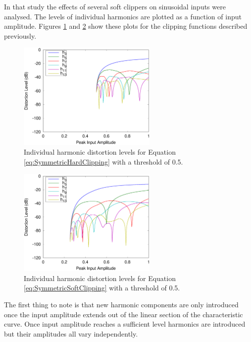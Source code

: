 			In that study the effects of several soft clippers on sinusoidal inputs were analysed. The levels
			of individual harmonics are plotted as a function of input amplitude. Figures
			\ref{fig:HardClippingHarmonics} and \ref{fig:SoftClippingHarmonics} show these plots for the
			clipping functions described previously.

			\begin{figure}[h!]
				\centering
				\includegraphics[width=0.6\textwidth]{chapter5/Images/HardClippingHarmonics.eps}
				\caption{Individual harmonic distortion levels for Equation \ref{eq:SymmetricHardClipping}
					 with a threshold of 0.5.}
				\label{fig:HardClippingHarmonics}
			\end{figure}

			\begin{figure}[h!]
				\centering
				\includegraphics[width=0.6\textwidth]{chapter5/Images/SoftClippingHarmonics.eps}
				\caption{Individual harmonic distortion levels for Equation \ref{eq:SymmetricSoftClipping}
					 with a threshold of 0.5.}
				\label{fig:SoftClippingHarmonics}
			\end{figure}

			The first thing to note is that new harmonic components are only introduced once the input
			amplitude extends out of the linear section of the characteristic curve. Once input amplitude
			reaches a sufficient level harmonics are introduced but their amplitudes all vary independently.

